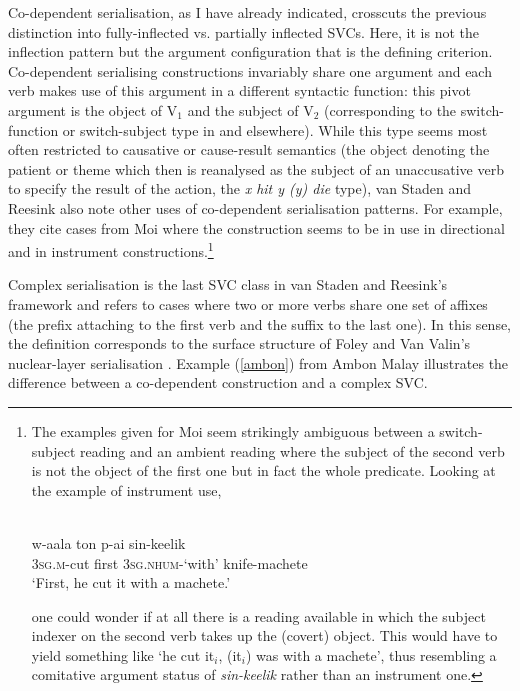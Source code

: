 Co-dependent serialisation, as I have already indicated, crosscuts the previous distinction into fully-inflected vs. partially inflected SVCs. Here, it is not the inflection pattern but the argument configuration that is the defining criterion. Co-dependent serialising constructions invariably share one argument and each verb makes use of this argument in a different syntactic function: this pivot argument is the object of V$_1$ and the subject of V$_2$ (corresponding to the switch-function or switch-subject type in \citealt{Aikhenvald2006} and elsewhere). While this type seems most often restricted to causative or cause-result semantics (the object denoting the patient or theme which then is reanalysed as the subject of an unaccusative verb to specify the result of the action, the \textit{x hit y (y) die} type), van Staden and Reesink also note other uses of co-dependent serialisation patterns. For example, they cite cases from Moi where the construction seems to be in use in directional and in instrument constructions.\footnote{The examples given for Moi seem strikingly ambiguous between a switch-subject reading and an ambient reading where the subject of the second verb is not the object of the first one but in fact the whole predicate. Looking at the example of instrument use,

\ea 
{}\\
\gll w-aala ton p-ai sin-keelik \\
\textsc{3}\textsc{sg}.\textsc{m}-cut first \textsc{3}\textsc{sg}.\textsc{nhum}-`with' knife-machete \\
\glft `First, he cut it with a machete.'\\ 
\z

one could wonder if at all there is a reading available in which the subject indexer on the second verb takes up the (covert) object. This would have to yield something like `he cut it$_i$, (it$_i$) was with a machete', thus resembling a comitative argument status of \textit{sin-keelik} rather than an instrument one.}

Complex serialisation is the last SVC class in van Staden and Reesink's framework and refers to cases where two or more verbs share one set of affixes (the prefix attaching to the first verb and the suffix to the last one). In this sense, the definition corresponds to the surface structure of Foley and Van Valin's \citep{foley1984functional} nuclear-layer serialisation \citep[26]{vanstaden2008serial}. Example (\ref{ambon}) from Ambon Malay illustrates the difference between a co-dependent construction and a complex SVC.

